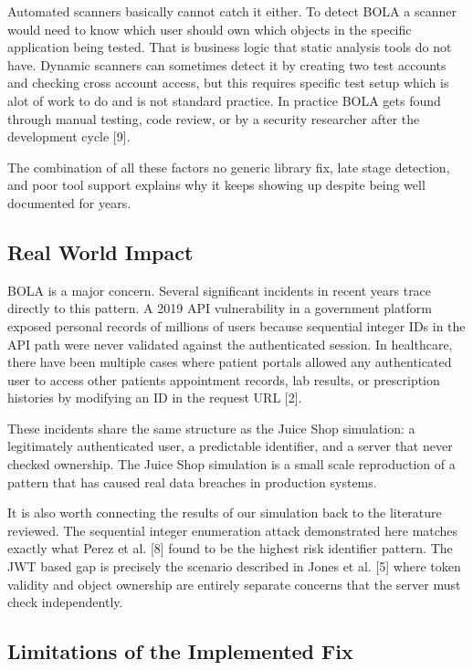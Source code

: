 \documentclass[12pt]{IEEEtran}
\begin{document}
Automated scanners basically cannot catch it either. To detect BOLA a scanner would need to know which user should own which objects in the specific application being tested. That is business logic that static analysis tools do not have. Dynamic scanners can sometimes detect it by creating two test accounts and checking cross account access, but this requires specific test setup which is alot of work to do and is not standard practice. In practice BOLA gets found through manual testing, code review, or by a security researcher after the development cycle [9].

The combination of all these factors no generic library fix, late stage detection, and poor tool support explains why it keeps showing up despite being well documented for years.

\subsection{Real World Impact}

BOLA is a major concern. Several significant incidents in recent years trace directly to this pattern. A 2019 API vulnerability in a government platform exposed personal records of millions of users because sequential integer IDs in the API path were never validated against the authenticated session. In healthcare, there have been multiple cases where patient portals allowed any authenticated user to access other patients appointment records, lab results, or prescription histories by modifying an ID in the request URL [2].

These incidents share the same structure as the Juice Shop simulation: a legitimately authenticated user, a predictable identifier, and a server that never checked ownership. The Juice Shop simulation is a small scale reproduction of a pattern that has caused real data breaches in production systems.

It is also worth connecting the results of our simulation back to the literature reviewed. The sequential integer enumeration attack demonstrated here matches exactly what Perez et al. [8] found to be the highest risk identifier pattern. The JWT based gap is precisely the scenario described in Jones et al. [5] where token validity and object ownership are entirely separate concerns that the server must check independently.

\subsection{Limitations of the Implemented Fix}
\end{document}
